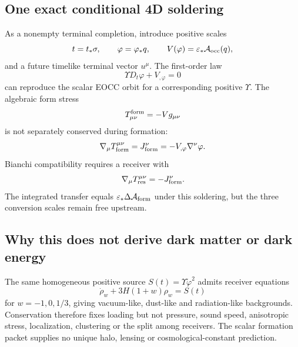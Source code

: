 \documentclass[11pt]{article}
\begin{document}
\subsection{One exact conditional 4D soldering}

As a nonempty terminal completion, introduce positive scales
\begin{equation}
 t=t_*\sigma,
 \qquad \varphi=\varphi_*q,
 \qquad V(\varphi)=\varepsilon_*\mathcal A_{\rm occ}(q),
 \label{eq:unit-soldering}
\end{equation}
and a future timelike terminal vector \(u^\mu\).  The first-order law
\begin{equation}
 \Upsilon D_t\varphi+V_{,\varphi}=0
 \label{eq:4d-formation-law}
\end{equation}
can reproduce the scalar EOCC orbit for a corresponding positive
\(\Upsilon\).  The algebraic form stress
\begin{equation}
 T_{\mu\nu}^{\rm form}=-Vg_{\mu\nu}
 \label{eq:form-stress}
\end{equation}
is not separately conserved during formation:
\begin{equation}
 \nabla_\mu T_{\rm form}^{\mu\nu}
 =J_{\rm form}^{\nu}
 =-V_{,\varphi}\nabla^\nu\varphi.
 \label{eq:exchange-current}
\end{equation}
Bianchi compatibility requires a receiver with
\begin{equation}
 \nabla_\mu T_{\rm res}^{\mu\nu}=-J_{\rm form}^{\nu}.
 \label{eq:receiver}
\end{equation}
The integrated transfer equals \(\varepsilon_*\Delta\mathcal A_{\rm form}\)
under this soldering, but the three conversion scales remain free upstream.

\subsection{Why this does not derive dark matter or dark energy}

The same homogeneous positive source
\(S(t)=\Upsilon\dot\varphi^2\) admits receiver equations
\begin{equation}
 \dot\rho_w+3H(1+w)\rho_w=S(t)
 \label{eq:receiver-family}
\end{equation}
for \(w=-1,0,1/3\), giving vacuum-like, dust-like and radiation-like
backgrounds.  Conservation therefore fixes loading but not pressure, sound
speed, anisotropic stress, localization, clustering or the split among
receivers.  The scalar formation packet supplies no unique halo, lensing or
cosmological-constant prediction.
\end{document}

